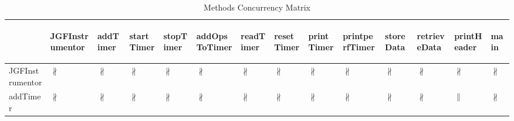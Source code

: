 \documentclass[10pt]{article}
\begin{document}
\begin{longtable}{|l|l|l|l|l|l|l|l|l|l|l|l|l|l|}
\caption{Methods Concurrency Matrix}\\
\hline
&\begin{sideways}JGFInstrumentor\end{sideways}&\begin{sideways}addTimer\end{sideways}&\begin{sideways}startTimer\end{sideways}&\begin{sideways}stopTimer\end{sideways}&\begin{sideways}addOpsToTimer\end{sideways}&\begin{sideways}readTimer\end{sideways}&\begin{sideways}resetTimer\end{sideways}&\begin{sideways}printTimer\end{sideways}&\begin{sideways}printperfTimer\end{sideways}&\begin{sideways}storeData\end{sideways}&\begin{sideways}retrieveData\end{sideways}&\begin{sideways}printHeader\end{sideways}&\begin{sideways}main\end{sideways}\\
\hline
JGFInstrumentor&{\color{BrickRed}$\nparallel$}&{\color{BrickRed}$\nparallel$}&{\color{BrickRed}$\nparallel$}&{\color{BrickRed}$\nparallel$}&{\color{BrickRed}$\nparallel$}&{\color{BrickRed}$\nparallel$}&{\color{BrickRed}$\nparallel$}&{\color{BrickRed}$\nparallel$}&{\color{BrickRed}$\nparallel$}&{\color{BrickRed}$\nparallel$}&{\color{BrickRed}$\nparallel$}&{\color{BrickRed}$\nparallel$}&{\color{BrickRed}$\nparallel$}\\
\hline
addTimer&{\color{BrickRed}$\nparallel$}&{\color{BrickRed}$\nparallel$}&{\color{BrickRed}$\nparallel$}&{\color{BrickRed}$\nparallel$}&{\color{BrickRed}$\nparallel$}&{\color{BrickRed}$\nparallel$}&{\color{BrickRed}$\nparallel$}&{\color{BrickRed}$\nparallel$}&{\color{BrickRed}$\nparallel$}&{\color{BrickRed}$\nparallel$}&{\color{BrickRed}$\nparallel$}&{\color{blue}$\parallel$}&{\color{BrickRed}$\nparallel$}\\

\end{longtable}
\end{document}
